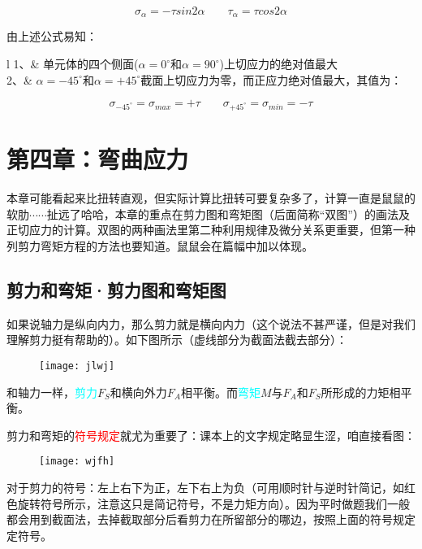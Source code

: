 \documentclass[10pt,a4paper]{ctexart}
\begin{document}
\begin{equation}
	\sigma_{\alpha}=-\tau sin2\alpha \qquad \tau_{\alpha}=\tau cos2\alpha
\end{equation}

由上述公式易知：

\begin{tblr}{l}
	1、& 单元体的四个侧面($\alpha=0^{\circ}$和$\alpha=90^{\circ}$)上切应力的绝对值最大\\
	2、&
	$\alpha=-45^{\circ}$和$\alpha=+45^{\circ}$截面上切应力为零，而正应力绝对值最大，其值为：\\
\end{tblr}
\begin{equation}
	\sigma_{-45^{\circ}}=\sigma_{max}=+\tau \qquad
	\sigma_{+45^{\circ}}=\sigma_{min}=-\tau
\end{equation}

\newpage

\section{第四章：弯曲应力}
本章可能看起来比扭转直观，但实际计算比扭转可要复杂多了，计算一直是鼠鼠的软肋$\cdots \cdots$扯远了哈哈，本章的重点在剪力图和弯矩图（后面简称“双图”）的画法及正切应力的计算。双图的两种画法里第二种利用规律及微分关系更重要，但第一种列剪力弯矩方程的方法也要知道。鼠鼠会在篇幅中加以体现。

\subsection{剪力和弯矩·剪力图和弯矩图}
如果说轴力是纵向内力，那么剪力就是横向内力（这个说法不甚严谨，但是对我们理解剪力挺有帮助的）。如下图所示（虚线部分为截面法截去部分）：
\begin{figure}[htp]%
	\centering
	\texttt{[image: jlwj]}
\end{figure}

和轴力一样，\textcolor{cyan}{剪力}$F_S$和横向外力$F_A$相平衡。而\textcolor{cyan}{弯矩}$M$与$F_A$和$F_S$所形成的力矩相平衡。

剪力和弯矩的\textcolor{red}{符号规定}就尤为重要了：课本上的文字规定略显生涩，咱直接看图：

\begin{figure}[htp]%
	\centering
	\texttt{[image: wjfh]}
\end{figure}

对于剪力的符号：左上右下为正，左下右上为负（可用顺时针与逆时针简记，如红色旋转符号所示，注意这只是简记符号，不是力矩方向）。因为平时做题我们一般都会用到截面法，去掉截取部分后看剪力在所留部分的哪边，按照上面的符号规定定符号。
\end{document}
